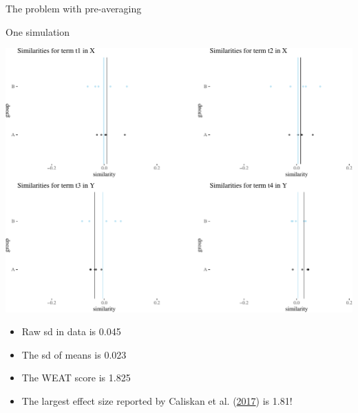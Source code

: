 \documentclass[10pt,ignorenonframetext,x11names, dvipsnames, bibspacing,natbib]{beamer}
\providecommand{\tightlist}{%
  \setlength{\itemsep}{0pt}\setlength{\parskip}{0pt}}
\begin{document}
\begin{frame}{The problem with pre-averaging}

\begin{block}{One simulation}

\vspace{1mm} \footnotesize

\begin{center}\includegraphics[width=0.7\linewidth]{presentationESSLLI_files/figure-beamer/unnamed-chunk-4-1} \end{center}

\normalsize

\vspace{1mm} \footnotesize

\normalsize
\pause

\footnotesize 

\vspace{-4mm}

\begin{itemize}
\tightlist
\item
  Raw sd in data is 0.045
\item
  The sd of means is 0.023
\item
  The WEAT score is 1.825
\item
  The largest effect size reported by Caliskan et al.
  (\protect\hyperlink{ref-Caliskan2017semanticsBiases}{2017}) is 1.81!
\end{itemize}

\end{block}

\end{frame}
\end{document}
